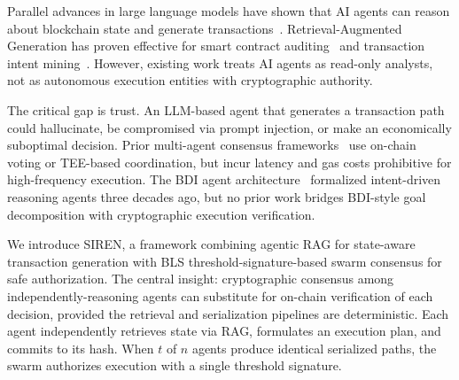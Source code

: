 \documentclass[11pt]{article}
\begin{document}
Parallel advances in large language models have shown that AI agents can reason about blockchain state and generate transactions~\cite{agent_blockchain_survey}. Retrieval-Augmented Generation has proven effective for smart contract auditing~\cite{rag_smart_contract_audit} and transaction intent mining~\cite{tim_framework}. However, existing work treats AI agents as read-only analysts, not as autonomous execution entities with cryptographic authority.

The critical gap is trust. An LLM-based agent that generates a transaction path could hallucinate, be compromised via prompt injection, or make an economically suboptimal decision. Prior multi-agent consensus frameworks~\cite{blockagents, swarm_contract} use on-chain voting or TEE-based coordination, but incur latency and gas costs prohibitive for high-frequency execution. The BDI agent architecture~\cite{bratman1987, rao_georgeff1991} formalized intent-driven reasoning agents three decades ago, but no prior work bridges BDI-style goal decomposition with cryptographic execution verification.

We introduce SIREN, a framework combining agentic RAG for state-aware transaction generation with BLS threshold-signature-based swarm consensus for safe authorization. The central insight: cryptographic consensus among independently-reasoning agents can substitute for on-chain verification of each decision, provided the retrieval and serialization pipelines are deterministic. Each agent independently retrieves state via RAG, formulates an execution plan, and commits to its hash. When $t$ of $n$ agents produce identical serialized paths, the swarm authorizes execution with a single threshold signature.
\end{document}
